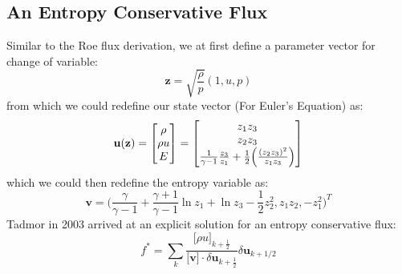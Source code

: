 \documentclass[a4paper]{article}
\numberwithin{equation}{section}
\begin{document}
\subsection{An Entropy Conservative Flux}
Similar to the Roe flux derivation, we at first define a parameter vector for change of variable:
\begin{equation}
    \mathbf{z} = \sqrt{\frac{\rho}{p}} (1, u, p)
\end{equation}
from which we could redefine our state vector (For Euler's Equation) as:
\begin{equation}
    \mathbf{u}(\mathbf{z}) = 
    \begin{bmatrix}
        \rho\\
        \rho u \\
        E\\
    \end{bmatrix} = 
    \begin{bmatrix}
        z_1 z_3\\
        z_2 z_3\\
        \frac{1}{\gamma - 1} \frac{z_3}{z_1} + \frac{1}{2} \Bigl(\frac
        {(z_2z_3)^2}{z_1z_3} \Bigr)
    \end{bmatrix}
\end{equation}
which we could then redefine the entropy variable as:
\begin{equation}
    \mathbf{v} = \big(\frac{\gamma}{\gamma - 1} + \frac{\gamma + 1}{\gamma -1} \ln z_1 + \ln z_3 - \frac{1}{2} z_2^2, z_1 z_2, -z_1^2\big)^T
\end{equation}
Tadmor in 2003 arrived at an explicit solution for an entropy conservative flux:
\begin{equation}
    f^* = \sum_k \frac{\big[ \rho u\big]_{k + \frac{1}{2}}}{ \big[ \mathbf{v}\big] \cdot \delta \mathbf{u}_{k + \frac{1}{2}}} \delta \mathbf{u}_{k+1/2}
\end{equation}
\end{document}

